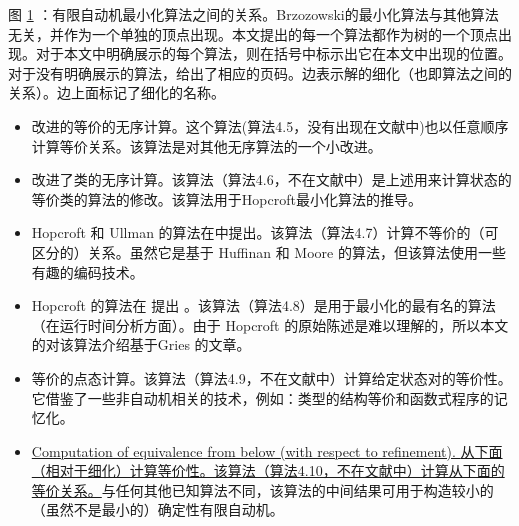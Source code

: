 \begin{figure}[tbp]
{
    }
    \caption{}
    \label{fig:1}
\end{figure}
图 \ref{fig:1} ：有限自动机最小化算法之间的关系。Brzozowski的最小化算法与其他算法无关，并作为一个单独的顶点出现。本文提出的每一个算法都作为树的一个顶点出现。对于本文中明确展示的每个算法，则在括号中标示出它在本文中出现的位置。对于没有明确展示的算法，给出了相应的页码。边表示解的细化（也即算法之间的关系）。边上面标记了细化的名称。

\begin{itemize}

    \item 改进的等价的无序计算。这个算法(算法4.5，没有出现在文献中)也以任意顺序计算等价关系。该算法是对其他无序算法的一个小改进。

    \item 改进了类的无序计算。该算法（算法4.6，不在文献中）是上述用来计算状态的等价类的算法的修改。该算法用于Hopcroft最小化算法的推导。

    \item Hopcroft 和 Ullman 的算法在\cite{Hu79}中提出。该算法（算法4.7）计算不等价的（可区分的）关系。虽然它是基于 Huffinan \cite{Huff54}和 Moore \cite{Moor56} 的算法，但该算法使用一些有趣的编码技术。

    \item Hopcroft 的算法在 \cite{Hopc71, Grie73} 提出 。该算法（算法4.8）是用于最小化的最有名的算法（在运行时间分析方面）。由于 Hopcroft 的原始陈述是难以理解的，所以本文的对该算法介绍基于Gries 的文章。

    \item 等价的点态计算。该算法（算法4.9，不在文献中）计算给定状态对的等价性。它借鉴了一些非自动机相关的技术，例如：类型的结构等价和函数式程序的记忆化。

    \item \uline{Computation of equivalence from below (with respect to refinement). }
    \uline{从下面（相对于细化）计算等价性。该算法（算法4.10，不在文献中）计算从下面的等价关系。}与任何其他已知算法不同，该算法的中间结果可用于构造较小的（虽然不是最小的）确定性有限自动机。

\end{itemize}